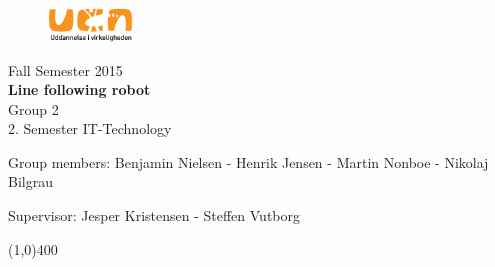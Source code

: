 \clearpage
\thispagestyle{empty}

\begin{figure}[H]
	\raggedleft
		\includegraphics[width=0.2\textwidth]{figures/logo-ucn.png}
\end{figure}
\vspace*{\fill} 
\begin{center}
\begin{Huge}
Fall Semester 2015\\
\vspace{5 mm}
\textbf{Line following robot}\\
\vspace{3 mm}
Group 2\\
\vspace{3 mm}
2. Semester IT-Technology
\end{Huge}
\end{center}
\vspace*{\fill}
\begin{center}
Group members:
 Benjamin Nielsen - Henrik Jensen - Martin Nonboe - Nikolaj Bilgrau
\end{center}
\begin{center}
Supervisor: Jesper Kristensen - Steffen Vutborg
\end{center}
\begin{center}
\line(1,0){400}
\end{center}